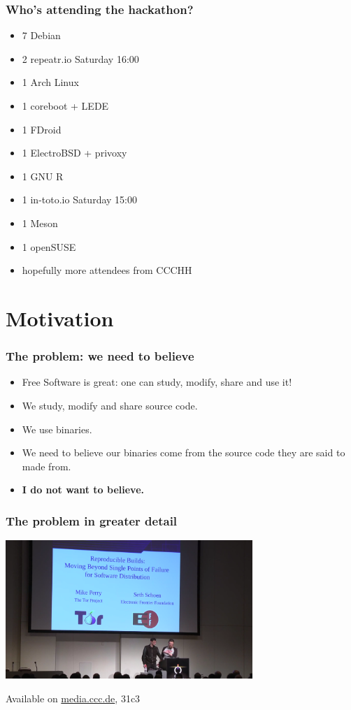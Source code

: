 \documentclass[14pt,aspectratio=169]{beamer}
\begin{document}
\begin{frame}
 \frametitle{Who's attending the hackathon?}
 \begin{itemize}
  \item 7 Debian
  \item 2 repeatr.io {{\color{debianred} Saturday 16:00}}
  \item 1 Arch Linux
  \item 1 coreboot + LEDE
  \item 1 FDroid
  \item 1 ElectroBSD + privoxy
  \item 1 GNU R
  \item 1 in-toto.io {{\color{debianred} Saturday 15:00}}
  \item 1 Meson
  \item 1 openSUSE
  \item hopefully more attendees from CCCHH
 \end{itemize}
\end{frame}

\section{Motivation}

\begin{frame}[fragile]
 \frametitle{The problem: we need to believe}
 \begin{itemize}
  \item Free Software is great: one can study, modify, share and use it!
  \item<2-4> We study, modify and share source code.
  \item<2-4> We use binaries.
  \item<3-4> We need to believe our binaries come from the source code they are said to made from.
  \item<4> \textbf{I do not want to believe.}
 
 \end{itemize}
\end{frame}

\begin{frame}
 \frametitle{The problem in greater detail}

 \begin{center}
  \includegraphics[width=0.7\textwidth]{images/31c3.png}

  Available on \url{media.ccc.de}, 31c3
 \end{center}
\end{frame}
\end{document}
